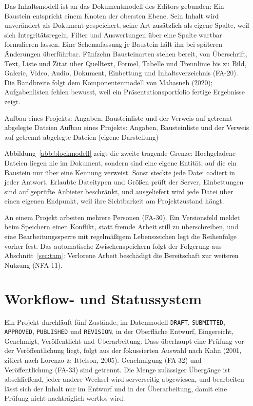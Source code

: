 Das Inhaltsmodell ist an das Dokumentmodell des Editors gebunden: Ein Baustein entspricht einem Knoten der obersten Ebene. Sein Inhalt wird unverändert als Dokument gespeichert, seine Art zusätzlich als eigene Spalte, weil sich Integritätsregeln, Filter und Auswertungen über eine Spalte wartbar formulieren lassen. Eine Schemafassung je Baustein hält ihn bei späteren Änderungen überführbar. Fünfzehn Bausteinarten stehen bereit, von Überschrift, Text, Liste und Zitat über Quelltext, Formel, Tabelle und Trennlinie bis zu Bild, Galerie, Video, Audio, Dokument, Einbettung und Inhaltsverzeichnis (FA-20). Die Bandbreite folgt dem Komponentenmodell von Mahasneh (2020); Aufgabenlisten fehlen bewusst, weil ein Präsentationsportfolio fertige Ergebnisse zeigt.

%
{Aufbau eines Projekts: Angaben, Bausteinliste und der Verweis auf getrennt abgelegte Dateien}%
{Aufbau eines Projekts: Angaben, Bausteinliste und der Verweis auf getrennt abgelegte Dateien (eigene Darstellung)}

Abbildung~\ref{abb:blockmodell} zeigt die zweite tragende Grenze: Hochgeladene Dateien liegen nie im Dokument, sondern sind eine eigene Entität, auf die ein Baustein nur über eine Kennung verweist. Sonst steckte jede Datei codiert in jeder Antwort. Erlaubte Dateitypen und Größen prüft der Server, Einbettungen sind auf geprüfte Anbieter beschränkt, und ausgeliefert wird jede Datei über einen eigenen Endpunkt, weil ihre Sichtbarkeit am Projektzustand hängt.

An einem Projekt arbeiten mehrere Personen (FA-30). Ein Versionsfeld meldet beim Speichern einen Konflikt, statt fremde Arbeit still zu überschreiben, und eine Bearbeitungssperre mit regelmäßigem Lebenszeichen legt die Reihenfolge vorher fest. Das automatische Zwischenspeichern folgt der Folgerung aus Abschnitt~\ref{sec:tam}: Verlorene Arbeit beschädigt die Bereitschaft zur weiteren Nutzung (NFA-11).

\section{Workflow- und Statussystem}
\label{sec:workflow}

Ein Projekt durchläuft fünf Zustände, im Datenmodell \texttt{DRAFT}, \texttt{SUBMITTED}, \texttt{APPROVED}, \texttt{PUBLISHED} und \texttt{REVISION}, in der Oberfläche Entwurf, Eingereicht, Genehmigt, Veröffentlicht und Überarbeitung. Dass überhaupt eine Prüfung vor der Veröffentlichung liegt, folgt aus der fokussierten Auswahl nach Kahn (2001, zitiert nach Lorenzo \& Ittelson, 2005). Genehmigung (FA-32) und Veröffentlichung (FA-33) sind getrennt. Die Menge zulässiger Übergänge ist abschließend, jeder andere Wechsel wird serverseitig abgewiesen, und bearbeiten lässt sich der Inhalt nur im Entwurf und in der Überarbeitung, damit eine Prüfung nicht nachträglich wertlos wird.

